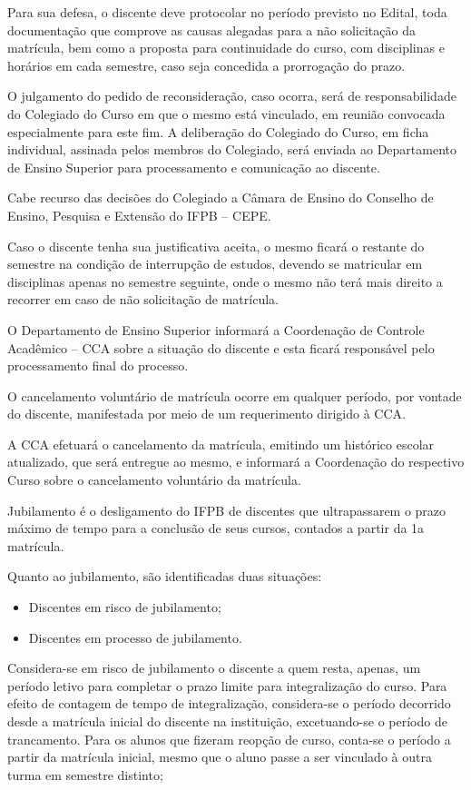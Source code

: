 		Para sua defesa, o discente deve protocolar no período previsto no Edital, toda documentação que comprove as causas alegadas para a não solicitação da matrícula, bem como a proposta para continuidade do curso, com disciplinas e horários em cada semestre, caso seja concedida a prorrogação do prazo.

		O julgamento do pedido de reconsideração, caso ocorra, será de responsabilidade do Colegiado do Curso em que o mesmo está vinculado, em reunião convocada especialmente para este fim. A deliberação do Colegiado do Curso, em ficha individual, assinada pelos membros do Colegiado, será enviada ao Departamento de Ensino Superior para processamento e comunicação ao discente.

		Cabe recurso das decisões do Colegiado a Câmara de Ensino do Conselho de Ensino, Pesquisa e Extensão do IFPB – CEPE.

		Caso o discente tenha sua justificativa aceita, o mesmo ficará o restante do semestre na condição de interrupção de estudos, devendo se matricular em disciplinas apenas no semestre seguinte, onde o mesmo não terá mais direito a recorrer em caso de não solicitação de matrícula.

		O Departamento de Ensino Superior informará a Coordenação de Controle Acadêmico – CCA sobre a situação do discente e esta ficará responsável pelo processamento final do processo.

		O cancelamento voluntário de matrícula ocorre em qualquer período, por vontade do discente, manifestada por meio de um requerimento dirigido à CCA.

		A CCA efetuará o cancelamento da matrícula, emitindo um histórico escolar atualizado, que será entregue ao mesmo, e informará a Coordenação do respectivo Curso sobre o cancelamento voluntário da matrícula.

		Jubilamento é o desligamento do IFPB de discentes que ultrapassarem o prazo máximo de tempo para a conclusão de seus cursos, contados a partir da 1a matrícula.
		
		Quanto ao jubilamento, são identificadas duas situações: 
		\begin{itemize}
			\item Discentes em risco de jubilamento;

			\item Discentes em processo de jubilamento.
		\end{itemize}
		
		Considera-se em risco de jubilamento o discente a quem resta, apenas, um período letivo para completar o prazo limite para integralização do curso. Para efeito de contagem de tempo de integralização, considera-se o período decorrido desde a matrícula inicial do discente na instituição, excetuando-se o período de trancamento. Para os alunos que fizeram reopção de curso, conta-se o período a partir da matrícula inicial, mesmo que o aluno passe a ser vinculado à outra turma em semestre distinto;

